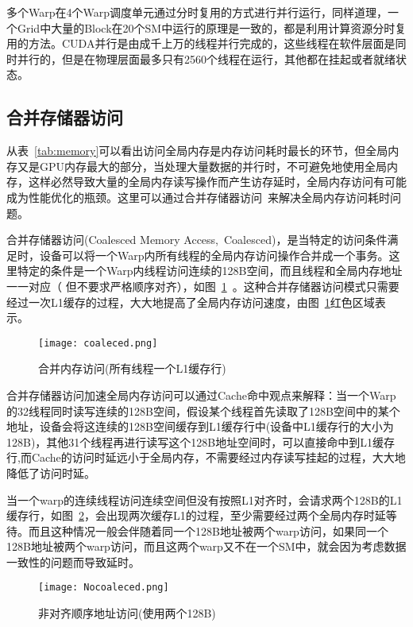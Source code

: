 多个Warp在4个Warp调度单元通过分时复用的方式进行并行运行，同样道理，一个Grid中大量的Block在20个SM中运行的原理是一致的，都是利用计算资源分时复用的方法。CUDA并行是由成千上万的线程并行完成的，这些线程在软件层面是同时并行的，但是在物理层面最多只有2560个线程在运行，其他都在挂起或者就绪状态。

\subsection{合并存储器访问}
\label{cha:chap02:coalesced}

从表~\ref{tab:memory}可以看出访问全局内存是内存访问耗时最长的环节，但全局内存又是GPU内存最大的部分，当处理大量数据的并行时，不可避免地使用全局内存，这样必然导致大量的全局内存读写操作而产生访存延时，全局内存访问有可能成为性能优化的瓶颈。这里可以通过合并存储器访问~\cite{nvidia2012c}来解决全局内存访问耗时问题。

合并存储器访问(Coalesced Memory Access,~Coalesced)，是当特定的访问条件满足时，设备可以将一个Warp内所有线程的全局内存访问操作合并成一个事务。这里特定的条件是一个Warp内线程访问连续的128B空间，而且线程和全局内存地址一一对应（ 但不要求严格顺序对齐），如图~\ref{fig:coalesced}~\cite{woolley2013gpu}。这种合并存储器访问模式只需要经过一次L1缓存的过程，大大地提高了全局内存访问速度，由图~\ref{fig:coalesced}红色区域表示。

\begin{figure}[H] %
	\centering
	\texttt{[image: coaleced.png]}
	\caption{合并内存访问(所有线程一个L1缓存行)}
	\label{fig:coalesced}
\end{figure}
合并存储器访问加速全局内存访问可以通过Cache命中观点来解释：当一个Warp的32线程同时读写连续的128B空间，假设某个线程首先读取了128B空间中的某个地址，设备会将这连续的128B空间缓存到L1缓存行中(设备中L1缓存行的大小为128B)，其他31个线程再进行读写这个128B地址空间时，可以直接命中到L1缓存行,而Cache的访问时延远小于全局内存，不需要经过内存读写挂起的过程，大大地降低了访问时延。

当一个warp的连续线程访问连续空间但没有按照L1对齐时，会请求两个128B的L1缓存行，如图~\ref{fig:Nocoaleced}，会出现两次缓存L1的过程，至少需要经过两个全局内存时延等待。而且这种情况一般会伴随着同一个128B地址被两个warp访问，如果同一个128B地址被两个warp访问，而且这两个warp又不在一个SM中，就会因为考虑数据一致性的问题而导致延时。

\begin{figure}[H] %
	\centering
	\texttt{[image: Nocoaleced.png]}
	\caption{非对齐顺序地址访问(使用两个128B)}
	\label{fig:Nocoaleced}
\end{figure}

